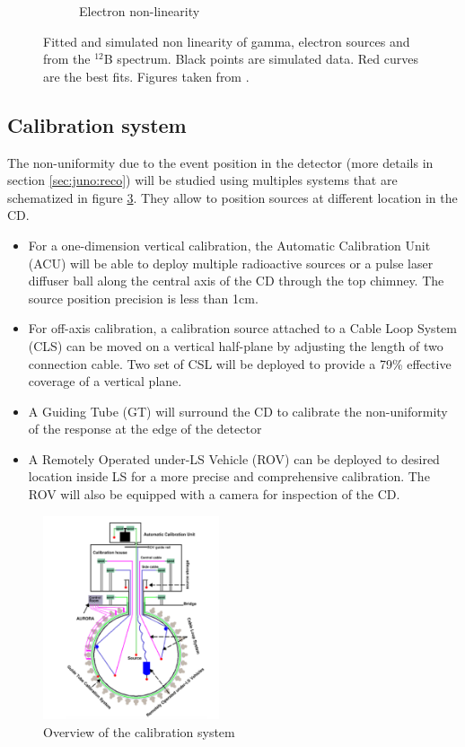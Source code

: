 \documentclass[../main.tex]{subfiles}
\begin{document}
\begin{figure}[ht]
\begin{subfigure}[b]{0.37\textwidth}
    \caption{Electron non-linearity}
    \label{fig:juno:nl:electron}
  \end{subfigure}
  \caption{Fitted and simulated non linearity of gamma, electron sources and from the $^{12}$B spectrum. Black points are simulated data. Red curves are the best fits. Figures taken from \cite{juno_collaboration_calibration_2021}.}
  \label{fig:juno:nl}
\end{figure}

\subsection{Calibration system}

The non-uniformity due to the event position in the detector (more details in section \ref{sec:juno:reco}) will be studied using multiples systems that are schematized in figure \ref{fig:juno:calib}. They allow to position sources at different location in the CD.

\begin{itemize}
  \item For a one-dimension vertical calibration, the Automatic Calibration Unit (ACU) will be able to deploy multiple radioactive sources or a pulse laser diffuser ball along the central axis of the CD through the top chimney. The source position precision is less than 1cm.
  \item For off-axis calibration, a calibration source attached to a Cable Loop System (CLS) can be moved on a vertical half-plane by adjusting the length of two connection cable. Two set of CSL will be deployed to provide a 79\% effective coverage of a vertical plane.
  \item A Guiding Tube (GT) will surround the CD to calibrate the non-uniformity of the response at the edge of the detector
  \item A Remotely Operated under-LS Vehicle (ROV) can be deployed to desired location inside LS for a more precise and comprehensive calibration. The ROV will also be equipped with a camera for inspection of the CD.
\end{itemize}

\begin{figure}[ht]
  \centering
  \includegraphics[height=6cm]{images/juno/calib.png}
  \caption{Overview of the calibration system}
  \label{fig:juno:calib}
\end{figure}
\end{document}
